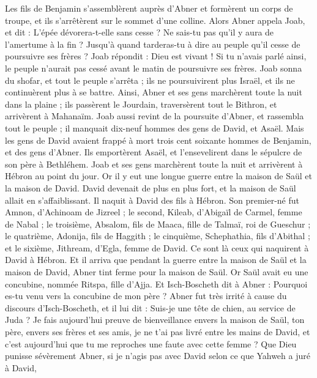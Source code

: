 \begin{multicols}{2}
Les fils de Benjamin s’assemblèrent auprès d'Abner et formèrent un corps de troupe, et ils s’arrêtèrent sur le sommet d'une colline.
Alors Abner appela Joab, et dit : L'épée dévorera-t-elle sans cesse ? Ne sais-tu pas qu’il y aura de l'amertume à la fin ? Jusqu’à quand tarderas-tu à dire au peuple qu'il cesse de poursuivre ses frères ?
Joab répondit : Dieu est vivant ! Si tu n’avais parlé ainsi, le peuple n’aurait pas cessé avant le matin de poursuivre ses frères.
Joab sonna du shofar, et tout le peuple s'arrêta ; ils ne poursuivirent plus Israël, et ils ne continuèrent plus à se battre.
Ainsi, Abner et ses gens marchèrent toute la nuit dans la plaine ; ils passèrent le Jourdain, traversèrent tout le Bithron, et arrivèrent à Mahanaïm.
Joab aussi revint de la poursuite d'Abner, et rassembla tout le peuple ; il manquait dix-neuf hommes des gens de David, et Asaël.
Mais les gens de David avaient frappé à mort trois cent soixante hommes de Benjamin, et des gens d'Abner.
Ils emportèrent Asaël, et l'ensevelirent dans le sépulcre de son père à Bethléhem. Joab et ses gens marchèrent toute la nuit et arrivèrent à Hébron au point du jour.
\VerseOne{}Or il y eut une longue guerre entre la maison de Saül et la maison de David. David devenait de plus en plus fort, et la maison de Saül allait en s’affaiblissant.
Il naquit à David des fils à Hébron. Son premier-né fut Amnon, d'Achinoam de Jizreel ;
le second, Kileab, d'Abigaïl de Carmel, femme de Nabal ; le troisième, Absalom, fils de Maaca, fille de Talmaï, roi de Gueschur ;
le quatrième, Adonija, fils de Haggith ; le cinquième, Schephathia, fils d'Abithal ;
et le sixième, Jithream, d'Egla, femme de David. Ce sont là ceux qui naquirent à David à Hébron.
Et il arriva que pendant la guerre entre la maison de Saül et la maison de David, Abner tint ferme pour la maison de Saül.
Or Saül avait eu une concubine, nommée Ritspa, fille d'Ajja. Et Isch-Boscheth dit à Abner : Pourquoi es-tu venu vers la concubine de mon père ?
Abner fut très irrité à cause du discours d'Isch-Boscheth, et il lui dit : Suis-je une tête de chien, au service de Juda ? Je fais aujourd'hui preuve de bienveillance envers la maison de Saül, ton père, envers ses frères et ses amis, je ne t'ai pas livré entre les mains de David, et c'est aujourd'hui que tu me reproches une faute avec cette femme ?
Que Dieu punisse sévèrement Abner, si je n'agis pas avec David selon ce que Yahweh a juré à David,

\end{multicols}
